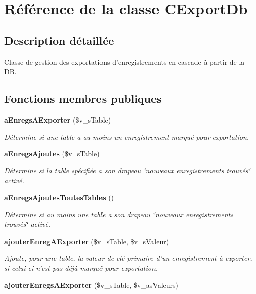 \section{Référence de la classe CExportDb}
\label{class_c_export_db}


\subsection{Description détaillée}
Classe de gestion des exportations d'enregistrements en cascade à partir de la DB. \subsection*{Fonctions membres publiques}
\begin{CompactItemize}
\item 
{\bf aEnregsAExporter} (\$v\_\-sTable)
\begin{CompactList}\small\item\em Détermine si une table a au moins un enregistrement marqué pour exportation. \item\end{CompactList}\item 
{\bf aEnregsAjoutes} (\$v\_\-sTable)
\begin{CompactList}\small\item\em Détermine si la table spécifiée a son drapeau \char`\"{}nouveaux enregistrements trouvés\char`\"{} activé. \item\end{CompactList}\item 
{\bf aEnregsAjoutesToutesTables} ()
\begin{CompactList}\small\item\em Détermine si au moins une table a son drapeau \char`\"{}nouveaux enregistrements trouvés\char`\"{} activé. \item\end{CompactList}\item 
{\bf ajouterEnregAExporter} (\$v\_\-sTable, \$v\_\-sValeur)
\begin{CompactList}\small\item\em Ajoute, pour une table, la valeur de clé primaire d'un enregistrement à exporter, si celui-ci n'est pas déjà marqué pour exportation. \item\end{CompactList}\item 
{\bf ajouterEnregsAExporter} (\$v\_\-sTable, \$v\_\-asValeurs)

\end{CompactItemize}
